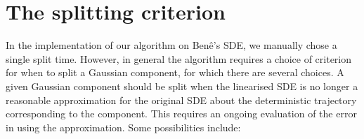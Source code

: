 
\section{The splitting criterion}
In the implementation of our algorithm on Ben\^e's SDE, we manually chose a single split time.
However, in general the algorithm requires a choice of criterion for when to split a Gaussian component, for which there are several choices.
A given Gaussian component should be split when the linearised SDE is no longer a reasonable approximation for the original SDE about the deterministic trajectory corresponding to the component.
This requires an ongoing evaluation of the error in using the approximation.
Some possibilities include:

